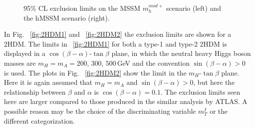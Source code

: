 \begin{figure}[htb]
\centering
{}

\caption{95$\%$ CL exclusion limits on the MSSM $m_h^{mod+}$ scenario (left) and the hMSSM scenario (right).}
    \label{fig:MSSM}
\end{figure}

In Fig. ~\ref{fig:2HDM1} and ~\ref{fig:2HDM2} the exclusion limits are shown for a 2HDM. The limits in ~\ref{fig:2HDM1} for both a type-1 and type-2 2HDM is displayed in a $\cos(\beta-\alpha)$-$\tan\beta$ plane, in which the neutral heavy Higgs boson masses are $m_{H}=m_{A}=200$, $300$, $500\,$GeV and the convention $\sin(\beta-\alpha) > 0$ is used. The plots in Fig. ~\ref{fig:2HDM2} show the limit in the $m_{H}$-$\tan\beta$ plane. Here it is again assumed that $m_{H}=m_{A}$ and $\sin(\beta-\alpha) > 0$, but here the relationship between $\beta$ and $\alpha$ is $\cos(\beta-\alpha)=0.1$. The exclusion limits seen here are larger compared to those produced in the similar analysis by ATLAS. A possible reason may be the choice of the discriminating variable $m_{T}^{I}$ or the different categorization.

